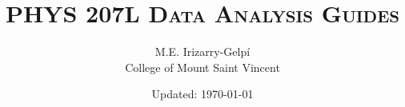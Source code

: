 \documentclass[letterpaper, 12pt]{report}
\begin{document}
\title{\textsc{PHYS 207L Data Analysis Guides}}
\author{M.E. Irizarry-Gelp\'{i}\\College of Mount Saint Vincent}
\date{Updated: \today}
\maketitle
\tableofcontents












\begin{appendices}
    
\end{appendices}
\end{document}

